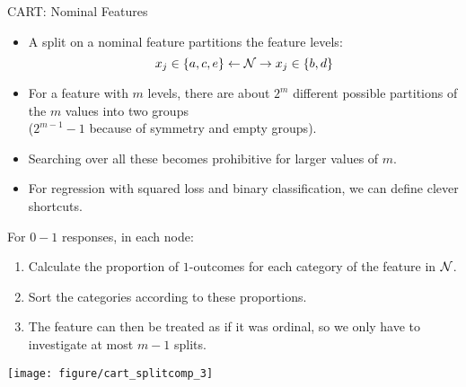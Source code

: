 \begin{vbframe}{CART: Nominal Features}
  \begin{itemize}
  \item A split on a nominal feature partitions the feature levels:
    $$x_j \in \{a,c,e\} \leftarrow \mathcal{N} \rightarrow x_j \in \{b,d\} $$
  \item For a feature with $m$ levels,
  there are about $2^m$ different possible partitions of the $m$ values into two groups\\ ($2^{m-1} - 1$ because of symmetry and empty groups).
  \item Searching over all these becomes prohibitive for larger values of $m$.
  \item For regression with squared loss and binary classification, we can define clever shortcuts.
  \end{itemize}

  \framebreak

For $0-1$ responses, in each node:
  \begin{enumerate}
  \item Calculate the proportion of $1$-outcomes for each category of the feature in $\mathcal{N}$.
  \item Sort the categories according to these proportions.
  \item The feature can then be treated as if it was ordinal, so we only have to investigate at most $m-1$ splits.
  \end{enumerate}

  \vspace{0.3cm}

\begin{knitrout}\scriptsize
{}\color{fgcolor}

{\centering \texttt{[image: figure/cart\_splitcomp\_3]} 

}



\end{knitrout}

\pagebreak


\end{vbframe}
